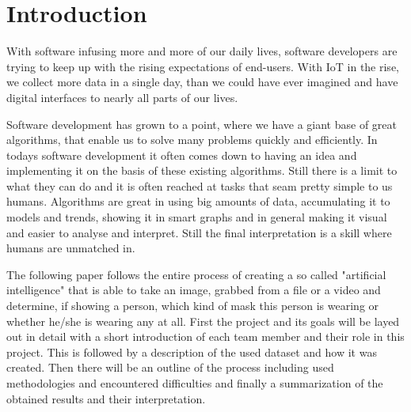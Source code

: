 \section{Introduction}

With software infusing more and more of our daily lives, software developers are
trying to keep up with the rising expectations of end-users. With IoT in the
rise, we collect more data in a single day, than we could have ever imagined and
have digital interfaces to nearly all parts of our lives. 


Software development has grown to a point, where we have a giant base of great
algorithms, that enable us to solve many problems quickly and efficiently. In
todays software development it often comes down to having an idea and
implementing it on the basis of these existing algorithms. Still there is a
limit to what they can do and it is often reached at tasks that seam pretty
simple to us humans. Algorithms are great in using big amounts of data,
accumulating it to models and trends, showing it in smart graphs and in general
making it visual and easier to analyse and interpret. Still the final
interpretation is a skill where humans are unmatched in. 


The following paper follows the entire process of creating a so called
"artificial intelligence" that is able to take an image, grabbed from a file or
a video and determine, if showing a person, which kind of mask this person is
wearing or whether he/she is wearing any at all. First the project and its goals
will be layed out in detail with a short introduction of each team member and
their role in this project. This is followed by a description of the used
dataset and how it was created. Then there will be an outline of the process
including used methodologies and encountered difficulties and finally a
summarization of the obtained results and their interpretation. 